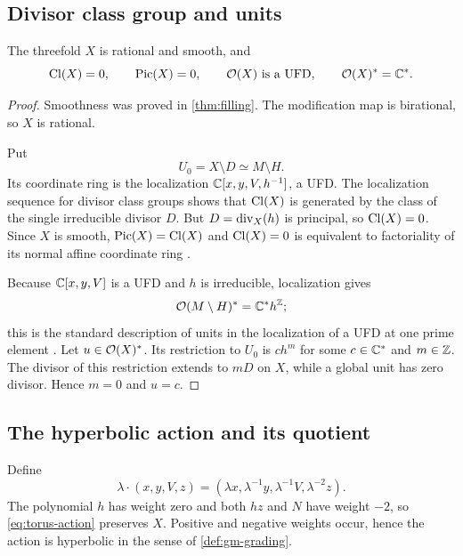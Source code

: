 \subsection{Divisor class group and units}

\begin{theorem}\label{thm:factorial-units}
The threefold $X$ is rational and smooth, and
\[
  \operatorname{Cl}(X)=0,
  \qquad
  \operatorname{Pic}(X)=0,
  \qquad
  \mathcal O(X)\text{ is a UFD},
  \qquad
  \mathcal O(X)^*=\mathbb C^*.
\]
\end{theorem}

\begin{proof}
Smoothness was proved in \cref{thm:filling}.  The modification map is birational, so $X$ is rational.

Put
\[
  U_0=X\setminus D\simeq M\setminus H.
\]
Its coordinate ring is the localization $\mathbb C[x,y,V,h^{-1}]$, a UFD.  The localization sequence for divisor class groups \cite[Chapter II, Proposition 6.5]{Hartshorne1977} shows that $\operatorname{Cl}(X)$ is generated by the class of the single irreducible divisor $D$.  But $D=\operatorname{div}_X(h)$ is principal, so $\operatorname{Cl}(X)=0$.  Since $X$ is smooth, $\operatorname{Pic}(X)=\operatorname{Cl}(X)$ and $\operatorname{Cl}(X)=0$ is equivalent to factoriality of its normal affine coordinate ring \cite[Chapter II, Section 6]{Hartshorne1977}.

Because $\mathbb C[x,y,V]$ is a UFD and $h$ is irreducible, localization gives
\[
  \mathcal O(M\setminus H)^*=\mathbb C^*h^{\mathbb Z};
\]
this is the standard description of units in the localization of a UFD at one prime element \cite[Chapters 1 and 3]{AtiyahMacdonald}.
Let $u\in\mathcal O(X)^*$.  Its restriction to $U_0$ is $ch^m$ for some $c\in\mathbb C^*$ and $m\in\mathbb Z$.  The divisor of this restriction extends to $mD$ on $X$, while a global unit has zero divisor.  Hence $m=0$ and $u=c$.
\end{proof}

\subsection{The hyperbolic action and its quotient}

\begin{construction}\label{con:torus-action}
Define
\begin{equation}\label{eq:torus-action}
  \lambda\cdot(x,y,V,z)
  =(\lambda x,\lambda^{-1}y,\lambda^{-1}V,\lambda^{-2}z).
\end{equation}
The polynomial $h$ has weight zero and both $hz$ and $N$ have weight $-2$, so \eqref{eq:torus-action} preserves $X$.  Positive and negative weights occur, hence the action is hyperbolic in the sense of \cref{def:gm-grading}.
\end{construction}

